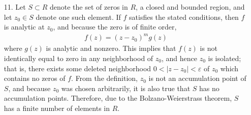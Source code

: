 \documentclass[a4paper,12pt]{article}
\begin{document}
\begin{enumerate}
    \item[11.]
        Let $S \subset R$ denote the set of zeros in $R$, a closed and bounded region, and let $z_0 \in S$ denote one such element. If $f$ satisfies the stated conditions, then $f$ is analytic at $z_0$, and because the zero is of finite order,
        \begin{align*}
            f(z) = (z - z_0)^m g(z)
        \end{align*}
        where $g(z)$ is analytic and nonzero. This implies that $f(z)$ is not identically equal to zero in any neighborhood of $z_0$, and hence $z_0$ is isolated; that is, there exists some deleted neighborhood $0 < |z - z_0| < \varepsilon$ of $z_0$ which contains no zeros of $f$. From the definition, $z_0$ is not an accumulation point of $S$, and because $z_0$ was chosen arbitrarily, it is also true that $S$ has no accumulation points. Therefore, due to the Bolzano-Weierstrass theorem, $S$ has a finite number of elements in $R$.
\end{enumerate}
\end{document}
